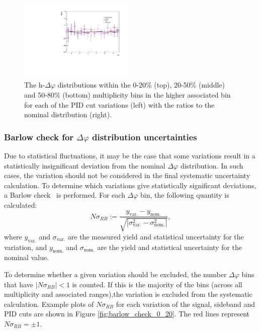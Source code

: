 \begin{figure}[ht]
    \includegraphics[width=0.49\textwidth]{figures/analysis/pid_variations_dphi_50_80_highpt_ratio.pdf}
    \caption{The h-\lmb $\Delta\varphi$ distributions within the 0-20\% (top), 20-50\% (middle) and 50-80\% (bottom) multiplicity bins in the higher associated \pt bin for each of the PID cut variations (left) with the ratios to the nominal distribution (right).}
    \label{fig:pid_cut_variations_highpt}
\end{figure}

\clearpage

\subsubsection{Barlow check for $\Delta\varphi$ distribution uncertainties}
\label{sec:barlow_check_dphi}

Due to statistical fluctuations, it may be the case that some variations result in a statistically insignificant deviation from the nominal $\Delta\varphi$ distribution. In such cases, the variation should not be considered in the final systematic uncertainty calculation. To determine which variations give statistically significant deviations, a Barlow check~\cite{BarlowCheck} is performed. For each $\Delta\varphi$ bin, the following quantity is calculated:
%
\begin{equation}
    \label{eq:barlow_check}
	N\sigma_{RB} := \frac{y_{\text{var.}} - y_{\text{nom.}}}{\sqrt{|\sigma_{\text{var.}}^2 - \sigma_{\text{nom.}}^2|}},
\end{equation}
%
where $y_{\text{var.}}$ and $\sigma_{\text{var.}}$ are the measured yield and statistical uncertainty for the variation, and $y_{\text{nom.}}$ and $\sigma_{\text{nom.}}$ are the yield and statistical uncertainty for the nominal value. 

To determine whether a given variation should be excluded, the number $\Delta\varphi$ bins that have $|N\sigma_{RB}| < 1$ is counted. If this is the majority of the bins (across all multiplicity and associated \pt ranges),the variation is excluded from the systematic calculation. Example plots of $N\sigma_{RB}$ for each variation of the signal, sideband and PID cuts are shown in Figure \ref{fig:barlow_check_0_20}. The red lines represent $N\sigma_{RB} = \pm 1$.

